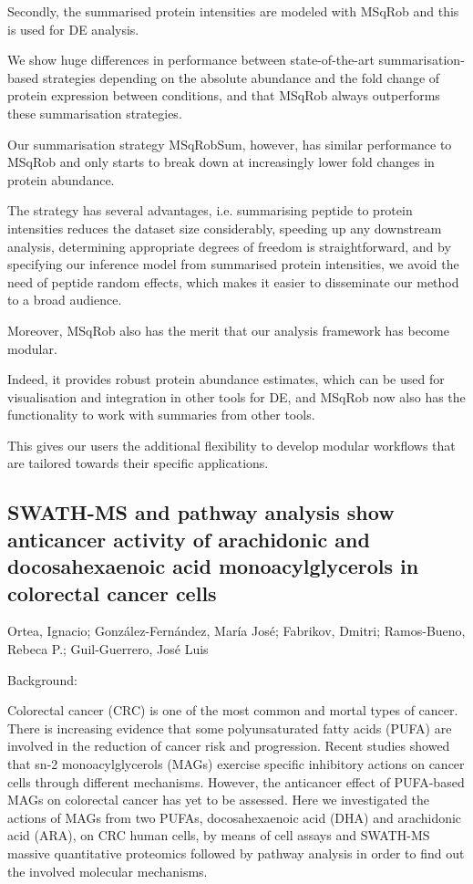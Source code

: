 {Secondly, the summarised protein intensities are modeled with MSqRob and this is used for DE analysis.  

We show huge differences in performance between state-of-the-art summarisation-based strategies depending on the absolute abundance and the fold change of protein expression between conditions, and that MSqRob always outperforms these summarisation strategies.

Our summarisation strategy MSqRobSum, however, has similar performance to MSqRob and only starts to break down at increasingly lower fold changes in protein abundance.

The strategy has several advantages, i.e. summarising peptide to protein intensities reduces the dataset size considerably, speeding up any downstream analysis, determining appropriate degrees of freedom is straightforward, and by specifying our inference model from summarised protein intensities, we avoid the need of peptide random effects, which makes it easier to disseminate our method to a broad audience.

Moreover, MSqRob also has the merit that our analysis framework has become modular.

Indeed, it provides robust protein abundance estimates, which can be used for visualisation and integration in other tools for DE, and MSqRob now also has the functionality to work with summaries from other tools.

This gives our users the additional flexibility to develop modular workflows that are tailored towards their specific applications.


\subsection*{\color{eubicRed} SWATH-MS and pathway analysis show anticancer activity of arachidonic and docosahexaenoic acid monoacylglycerols in colorectal cancer cells}
{\color{eubicGray}Ortea, Ignacio;
González-Fernández, María José;
Fabrikov, Dmitri;
Ramos-Bueno, Rebeca P.;
Guil-Guerrero, José Luis}

Background:

Colorectal cancer (CRC) is one of the most common and mortal types of cancer. There is increasing evidence that some polyunsaturated fatty acids (PUFA) are involved in the reduction of cancer risk and progression. Recent studies showed that sn-2 monoacylglycerols (MAGs) exercise specific inhibitory actions on cancer cells through different mechanisms. However, the anticancer effect of PUFA-based MAGs on colorectal cancer has yet to be assessed. Here we investigated the actions of MAGs from two PUFAs, docosahexaenoic acid (DHA) and arachidonic acid (ARA), on CRC human cells, by means of cell assays and SWATH-MS massive quantitative proteomics followed by pathway analysis in order to find out the involved molecular mechanisms.

}
